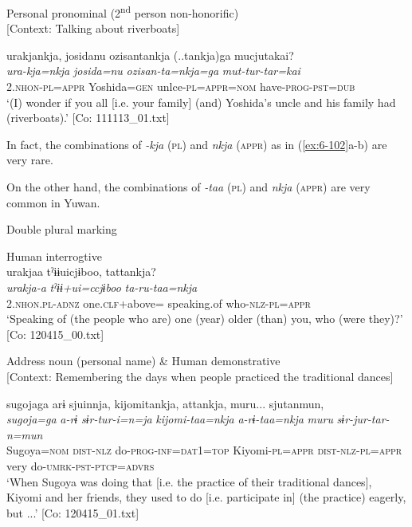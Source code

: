\ex Personal pronominal (2\textsuperscript{nd} person non-honorific)\\{}
[Context: Talking about riverboats]

{\TM}
\glll urakjankja,  josidanu  ozisantankja (..tankja)ga     mucjutakai?\\
      \textit{ura-kja=nkja}  \textit{josida=nu}  \textit{ozisan-ta=nkja=ga}   \textit{mut-tur-tar=kai}\\
      2.\textsc{nhon}-\textsc{pl}=\textsc{appr}  Yoshida=\textsc{gen}  unlce-\textsc{pl}=\textsc{appr}=\textsc{nom}  have-\textsc{prog}-\textsc{pst}=\textsc{dub}\\
\glt ‘(I) wonder if you all [i.e. your family] (and) Yoshida’s uncle and his family had (riverboats).’ [Co: 111113\_01.txt]
\z
\z

In fact, the combinations of \textit{-kja} (\textsc{pl}) and \textit{nkja} (\textsc{appr}) as in (\ref{ex:6-102}a-b) are very rare.

On the other hand, the combinations of \textit{-taa} (\textsc{pl}) and \textit{nkja} (\textsc{appr}) are very common in Yuwan.

\ea\label{ex:6-103}
  Double plural marking

 \ea Human interrogtive\\
{\TM}
\glll  urakjaa  tˀɨɨuicjɨboo,  tattankja?\\
\textit{urakja-a}  \textit{tˀɨɨ+ui=ccjɨboo}  \textit{ta-ru-taa=nkja}\\
2.\textsc{nhon}.\textsc{pl}-\textsc{adnz}  one.\textsc{clf}+above= speaking.of  who-\textsc{nlz}-\textsc{pl}=\textsc{appr}\\
\glt ‘Speaking of (the people who are) one (year) older (than) you, who (were they)?’ [Co: 120415\_00.txt]

\ex Address noun (personal name) \& Human demonstrative\\{}
[Context: Remembering the days when people practiced the traditional dances]

{\TM}
\glll sugojaga  arɨ  sjuinnja,  kijomitankja,   attankja,  muru...  sjutanmun,\\
      \textit{sugoja=ga}  \textit{a-rɨ}  \textit{sɨr-tur-i=n=ja}  \textit{kijomi-taa=nkja}    \textit{a-rɨ-taa=nkja}  \textit{muru}  \textit{sɨr-jur-tar-n=mun}\\
      Sugoya=\textsc{nom}  \textsc{dist}-\textsc{nlz}  do-\textsc{prog}-\textsc{inf}=\textsc{dat}1=\textsc{top}  Kiyomi-\textsc{pl}=\textsc{appr}      \textsc{dist}-\textsc{nlz}-\textsc{pl}=\textsc{appr}  very  do-\textsc{umrk}-\textsc{pst}-\textsc{ptcp}=\textsc{advrs}\\
\glt ‘When Sugoya was doing that [i.e. the practice of their traditional dances], Kiyomi and her friends, they used to do [i.e. participate in] (the practice) eagerly, but ...’ [Co: 120415\_01.txt]

